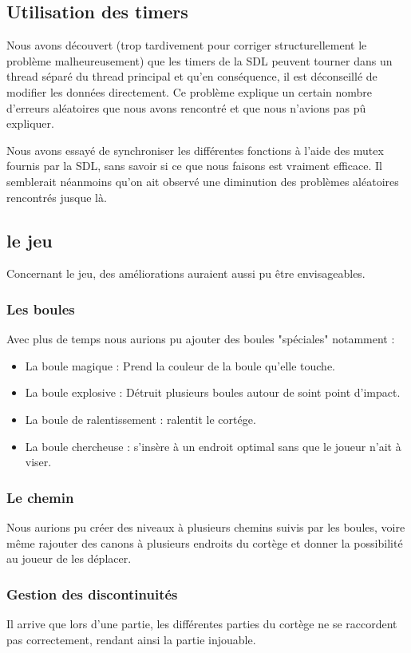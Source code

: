 \subsection{Utilisation des timers}
Nous avons découvert (trop tardivement pour corriger structurellement le
problème malheureusement) que les timers de la SDL peuvent tourner
dans un thread séparé du thread principal et qu'en conséquence, il est
déconseillé de modifier les données directement. Ce problème explique
un certain nombre d'erreurs aléatoires que nous avons rencontré et que
nous n'avions pas pû expliquer.

Nous avons essayé de synchroniser les différentes fonctions à l'aide des
mutex fournis par la SDL, sans savoir si ce que nous faisons est
vraiment efficace. Il semblerait néanmoins qu'on ait observé une
diminution des problèmes aléatoires rencontrés jusque là.
\subsection{le jeu}
Concernant le jeu, des améliorations auraient aussi pu être envisageables.

\subsubsection{Les boules}
Avec plus de temps nous aurions pu ajouter des boules "spéciales" notamment :
\begin{itemize}
  \item La boule magique : Prend la couleur de la boule qu'elle touche. 
  \item La boule explosive : Détruit plusieurs boules autour de soint point d'impact.
  \item La boule de ralentissement : ralentit le cortége.
  \item La boule chercheuse : s'insère à un endroit optimal sans que le joueur n'ait à viser.
\end{itemize} 

\subsubsection{Le chemin}
Nous aurions pu créer des niveaux à plusieurs chemins suivis par les boules, voire même rajouter des canons à plusieurs endroits du cortège et donner la possibilité au joueur de les déplacer. 

\subsubsection{Gestion des discontinuités}
Il arrive que lors d'une partie, les différentes parties du cortège ne
se raccordent pas correctement, rendant ainsi la partie injouable.

